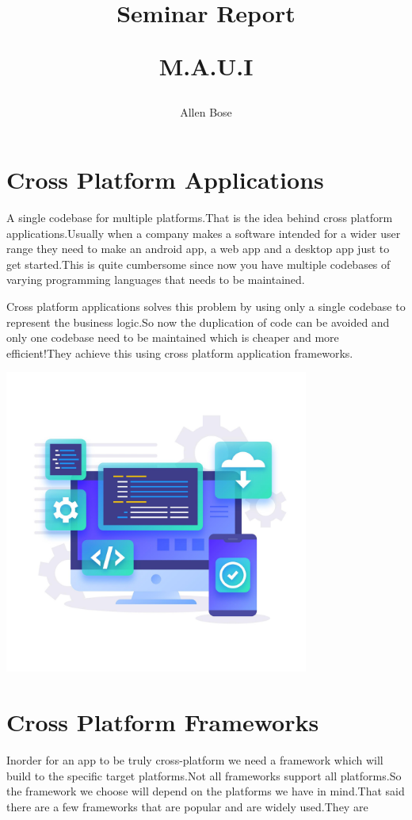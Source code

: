 \documentclass[14pt]{extarticle}
\title{
     \huge Seminar Report \par
     \Huge M.A.U.I
}
\author{
    Allen Bose
}
\begin{document}
\maketitle
{}

\newpage
\tableofcontents
\newpage
{}
\section{
  Cross Platform Applications
 }
\parbox{\linewidth}{
    A single codebase for multiple platforms.That is the idea behind cross platform applications.Usually when a company makes a software intended for a wider user range they need to make an android app, a web app and a desktop app just to get started.This is quite cumbersome since now you have multiple codebases of varying programming languages that needs to be maintained.
}

\parbox{\linewidth}{
    Cross platform applications solves this problem by using only a single codebase to represent the business logic.So now the duplication of code can be avoided and only one codebase need to be maintained which is cheaper and more efficient!They achieve this using cross platform application frameworks.
}

\begin{center}
    \includegraphics[width=100mm,height=100mm,keepaspectratio]{cross-platform-app.jpg}
\end{center}

\newpage
\section{
  Cross Platform Frameworks
 }
\parbox{\linewidth}{
    Inorder for an app to be truly cross-platform we need a framework which will build to the specific target platforms.Not all frameworks support all platforms.So the framework we choose will depend on the platforms we have in mind.That said there are a few frameworks that are popular and are widely used.They are
}
\end{document}
